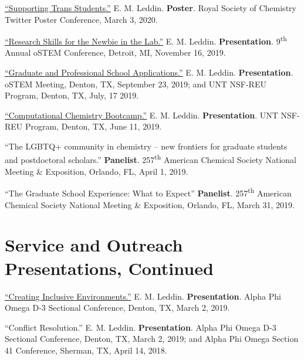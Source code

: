 \documentclass[letterpaper,11pt]{article}
\begin{document}
\begin{etaremune}[start=15]
{  \item \textnormal{\href{https://twitter.com/EmLedd1/status/1234812260515749889?s=20}{``Supporting Trans Students.''} E. M. Leddin. \textbf{Poster}. Royal Society of Chemistry Twitter Poster Conference, March 3, 2020.}
  \item \textnormal{\href{http://bit.ly/2019-oSTEM-PROF10}{``Research Skills for the Newbie in the Lab.''} E. M. Leddin. \textbf{Presentation}. 9\textsuperscript{th} Annual oSTEM Conference, Detroit, MI, November 16, 2019.}
\item \textnormal{\href{https://www.youtube.com/watch?v=6VkSUhsZr40&feature=youtu.be}{``Graduate and Professional School Applications.''} E. M. Leddin. \textbf{Presentation}. oSTEM Meeting, Denton, TX, September 23, 2019; and UNT NSF-REU Program, Denton, TX, July, 17 2019.}
  \item \textnormal{\href{http://bit.ly/2019-UNTREU-CCBC}{``Computational Chemistry Bootcamp.''} E. M. Leddin. \textbf{Presentation}. UNT NSF-REU Program, Denton, TX, June 11, 2019.}
  \item \textnormal{``The LGBTQ+ community in chemistry -- new frontiers for graduate students and postdoctoral scholars.'' \textbf{Panelist}. 257\textsuperscript{th} American Chemical Society National Meeting \& Exposition, Orlando, FL, April 1, 2019.}
  \item \textnormal{``The Graduate School Experience: What to Expect'' \textbf{Panelist}. 257\textsuperscript{th} American Chemical Society National Meeting \& Exposition, Orlando, FL, March 31, 2019.}
  }
\end{etaremune}  
  
\section{Service and Outreach Presentations, Continued}
\begin{etaremune}[start=2]
\small{
  \item \textnormal{ \href{https://docs.google.com/presentation/d/1mKDUxe-elMQ7EkTBglIQBeZlcsdBwmfP5loLxAsshF0/edit}{``Creating Inclusive Environments.''} E. M. Leddin. \textbf{Presentation}. Alpha Phi Omega D-3 Sectional Conference, Denton, TX, March 2, 2019.}
  \item \textnormal{``Conflict Resolution.'' E. M. Leddin. \textbf{Presentation}. Alpha Phi Omega D-3 Sectional Conference, Denton, TX, March 2, 2019; and Alpha Phi Omega Section 41 Conference, Sherman, TX, April 14, 2018.}
  }
\end{etaremune}
\end{document}
